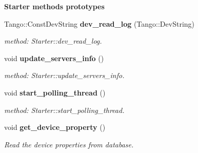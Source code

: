 \begin{Indent}{\bf Starter methods prototypes}
\begin{CompactItemize}
Tango::Const\-Dev\-String {\bf dev\_\-read\_\-log} (Tango::Dev\-String)
\begin{CompactList}\small\item\em method: Starter::dev\_\-read\_\-log.\item\end{CompactList}\item 
void {\bf update\_\-servers\_\-info} ()
\begin{CompactList}\small\item\em method: Starter::update\_\-servers\_\-info.\item\end{CompactList}\item 
void {\bf start\_\-polling\_\-thread} ()
\begin{CompactList}\small\item\em method: Starter::start\_\-polling\_\-thread.\item\end{CompactList}\item 
void {\bf get\_\-device\_\-property} ()
\begin{CompactList}\small\item\em Read the device properties from database.\item\end{CompactList}\end{CompactItemize}
\end{Indent}
